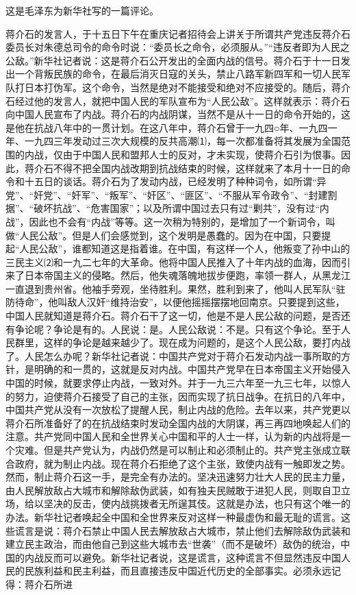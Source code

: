 \documentclass[UTF-8, a5paper, 12pt]{ctexart}
\begin{document}
这是毛泽东为新华社写的一篇评论。

蒋介石的发言人，于十五日下午在重庆记者招待会上讲关于所谓共产党违反蒋介石委员长对朱德总司令的命令时说：“委员长之命令，必须服从。”“违反者即为人民之公敌。”新华社记者说：这是蒋介石公开发出的全面内战的信号。蒋介石于十一日发出一个背叛民族的命令，在最后消灭日寇的关头，禁止八路军新四军和一切人民军队打日本打伪军。这个命令，当然是绝对不能接受和绝对不应接受的。随后，蒋介石经过他的发言人，就把中国人民的军队宣布为“人民公敌”。这样就表示：蒋介石向中国人民宣布了内战。蒋介石的内战阴谋，当然不是从十一日的命令开始的，这是他在抗战八年中的一贯计划。在这八年中，蒋介石曾于一九四○年、一九四一年、一九四三年发动过三次大规模的反共高潮⑴，每一次都准备将其发展为全国范围的内战，仅由于中国人民和盟邦人士的反对，才未实现，使蒋介石引为恨事。因此，蒋介石不得不把全国内战改期到抗战结束的时候，这样就来了本月十一日的命令和十五日的谈话。蒋介石为了发动内战，已经发明了种种词令，如所谓“异党”、“奸党”、“奸军”、“叛军”、“奸区”、“匪区”、“不服从军令政令”、“封建割据”、“破坏抗战”、“危害国家”；以及所谓中国过去只有过“剿共”，没有过“内战”，因此也不会有“内战”等等。这一次稍为特别的，是增加了一个新词令，叫做“人民公敌”。但是人们会感觉到，这个发明是愚蠢的。因为在中国，只要提起“人民公敌”，谁都知道这是指着谁。在中国，有这样一个人，他叛变了孙中山的三民主义⑵和一九二七年的大革命。他将中国人民推入了十年内战的血海，因而引来了日本帝国主义的侵略。然后，他失魂落魄地拔步便跑，率领一群人，从黑龙江一直退到贵州省。他袖手旁观，坐待胜利。果然，胜利到来了，他叫人民军队“驻防待命”，他叫敌人汉奸“维持治安”，以便他摇摇摆摆地回南京。只要提到这些，中国人民就知道是蒋介石。蒋介石干了这一切，他是不是人民公敌的问题，是否还有争论呢？争论是有的。人民说：是。人民公敌说：不是。只有这个争论。至于人民群里，这样的争论是越来越少了。现在成为问题的，是这个人民公敌，要打内战了。人民怎么办呢？新华社记者说：中国共产党对于蒋介石发动内战一事所取的方针，是明确的和一贯的，这就是反对内战。中国共产党早在日本帝国主义开始侵入中国的时候，就要求停止内战，一致对外。并于一九三六年至一九三七年，以惊人的努力，迫使蒋介石接受了自己的主张，因而实现了抗日战争。在抗日的八年中，中国共产党从没有一次放松了提醒人民，制止内战的危险。去年以来，共产党更以蒋介石所准备好了的在抗战结束时发动全国内战的大阴谋，再三再四地唤起人们的注意。共产党同中国人民和全世界关心中国和平的人士一样，认为新的内战将是一个灾难。但是共产党认为，内战仍然是可以制止和必须制止的。共产党主张成立联合政府，就为制止内战。现在蒋介石拒绝了这个主张，致使内战有一触即发之势。然而，制止蒋介石这一手，是完全有办法的。坚决迅速努力壮大人民的民主力量，由人民解放敌占大城市和解除敌伪武装，如有独夫民贼敢于进犯人民，则取自卫立场，给以坚决的反击，使内战挑拨者无所逞其伎。这就是办法，也只有这个唯一的办法。新华社记者唤起全中国和全世界来反对这样一种最虚伪和最无耻的谎言。这些谎言是说：蒋介石禁止中国人民去解放敌占大城市，禁止他们去解除敌伪武装和建立民主政治，而由他自己到这些大城市去“世袭”（而不是破坏）敌伪的统治，中国的内战反而可以避免。新华社记者说，这是谎言，这种谎言不但显然违反中国人民的民族利益和民主利益，而且直接违反中国近代历史的全部事实。必须永远记得：蒋介石所进
\end{document}

